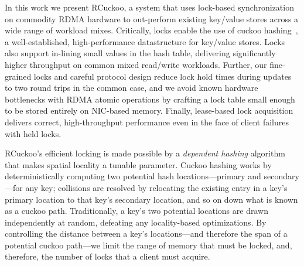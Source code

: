 In this work we present RCuckoo, a system that uses lock-based synchronization
on commodity RDMA hardware to out-perform existing key/value stores across a
wide range of workload mixes.
Critically, locks enable the use of cuckoo hashing~\cite{cuckoo}, a
well-established, high-performance datastructure for key/value stores.
Locks also support in-lining small values in the hash table,
delivering
significantly higher throughput on common mixed read/write workloads.
Further, our fine-grained locks and careful protocol design reduce
lock hold times during updates to two round trips in the common
case, and we avoid known hardware bottlenecks with RDMA atomic
operations by crafting a lock table small enough to be stored entirely
on NIC-based memory.  Finally, lease-based lock acquisition
delivers correct, high-throughput performance even in the
face of client failures with held locks.

RCuckoo's efficient locking is made possible by a \emph{dependent
hashing} algorithm that makes spatial locality a tunable parameter.
Cuckoo hashing works by deterministically computing two potential hash
locations---primary and secondary---for any key; collisions are
resolved by relocating the existing entry in a key's primary location
to that key's secondary location, and so on down what is known as a
cuckoo path.  Traditionally, a key's two potential locations are drawn
independently at random, defeating any locality-based optimizations.
By controlling the distance between a key's locations---and therefore
the span of a potential cuckoo path---we limit the range of memory
that must be locked, and, therefore, the number of locks that a client
must acquire.





